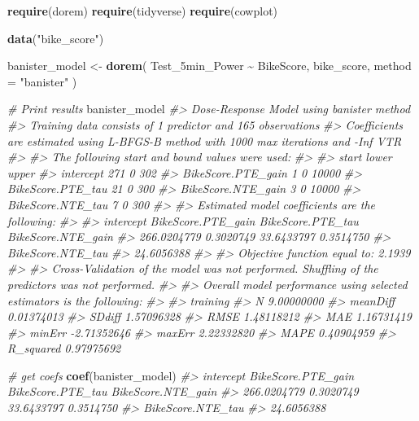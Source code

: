 \documentclass[
]{book}
\newenvironment{Shaded}{\begin{snugshade}}{\end{snugshade}}
\newcommand{\CommentTok}[1]{\textcolor[rgb]{0.56,0.35,0.01}{\textit{#1}}}
\newcommand{\DataTypeTok}[1]{\textcolor[rgb]{0.13,0.29,0.53}{#1}}
\newcommand{\KeywordTok}[1]{\textcolor[rgb]{0.13,0.29,0.53}{\textbf{#1}}}
\newcommand{\NormalTok}[1]{#1}
\newcommand{\OperatorTok}[1]{\textcolor[rgb]{0.81,0.36,0.00}{\textbf{#1}}}
\newcommand{\StringTok}[1]{\textcolor[rgb]{0.31,0.60,0.02}{#1}}
\begin{document}
\begin{Shaded}
\begin{Highlighting}[]
\KeywordTok{require}\NormalTok{(dorem)}
\KeywordTok{require}\NormalTok{(tidyverse)}
\KeywordTok{require}\NormalTok{(cowplot)}

\KeywordTok{data}\NormalTok{(}\StringTok{"bike\_score"}\NormalTok{)}

\NormalTok{banister\_model <{-}}\StringTok{ }\KeywordTok{dorem}\NormalTok{(}
\NormalTok{   Test\_5min\_Power }\OperatorTok{\textasciitilde{}}\StringTok{ }\NormalTok{BikeScore,}
\NormalTok{   bike\_score,}
   \DataTypeTok{method =} \StringTok{"banister"}
\NormalTok{)}

\CommentTok{\# Print results}
\NormalTok{banister\_model}
\CommentTok{\#> Dose{-}Response Model using banister method}
\CommentTok{\#> Training data consists of 1 predictor and 165 observations}
\CommentTok{\#> Coefficients are estimated using L{-}BFGS{-}B method with 1000 max iterations and {-}Inf VTR}
\CommentTok{\#> }
\CommentTok{\#> The following start and bound values were used:}
\CommentTok{\#> }
\CommentTok{\#>                    start lower upper}
\CommentTok{\#> intercept            271     0   302}
\CommentTok{\#> BikeScore.PTE\_gain     1     0 10000}
\CommentTok{\#> BikeScore.PTE\_tau     21     0   300}
\CommentTok{\#> BikeScore.NTE\_gain     3     0 10000}
\CommentTok{\#> BikeScore.NTE\_tau      7     0   300}
\CommentTok{\#> }
\CommentTok{\#> Estimated model coefficients are the following:}
\CommentTok{\#> }
\CommentTok{\#>          intercept BikeScore.PTE\_gain  BikeScore.PTE\_tau BikeScore.NTE\_gain }
\CommentTok{\#>        266.0204779          0.3020749         33.6433797          0.3514750 }
\CommentTok{\#>  BikeScore.NTE\_tau }
\CommentTok{\#>         24.6056388 }
\CommentTok{\#> }
\CommentTok{\#> Objective function equal to: 2.1939 }
\CommentTok{\#> }
\CommentTok{\#> Cross{-}Validation of the model was not performed. Shuffling of the predictors was not performed.}
\CommentTok{\#> }
\CommentTok{\#> Overall model performance using selected estimators is the following:}
\CommentTok{\#> }
\CommentTok{\#>              training}
\CommentTok{\#> N          9.00000000}
\CommentTok{\#> meanDiff   0.01374013}
\CommentTok{\#> SDdiff     1.57096328}
\CommentTok{\#> RMSE       1.48118212}
\CommentTok{\#> MAE        1.16731419}
\CommentTok{\#> minErr    {-}2.71352646}
\CommentTok{\#> maxErr     2.22332820}
\CommentTok{\#> MAPE       0.40904959}
\CommentTok{\#> R\_squared  0.97975692}

\CommentTok{\# get coefs}
\KeywordTok{coef}\NormalTok{(banister\_model)}
\CommentTok{\#>          intercept BikeScore.PTE\_gain  BikeScore.PTE\_tau BikeScore.NTE\_gain }
\CommentTok{\#>        266.0204779          0.3020749         33.6433797          0.3514750 }
\CommentTok{\#>  BikeScore.NTE\_tau }
\CommentTok{\#>         24.6056388}


\end{Highlighting}
\end{Shaded}
\end{document}

